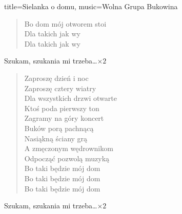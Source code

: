 \begin{song}{title={Sielanka o domu}, music={Wolna Grupa Bukowina}}
\begin{multicols}{2}
\begin{verse}
        Bo dom mój otworem stoi \\
        Dla takich jak wy \\
        Dla takich jak wy
    \end{verse}
    \begin{chorus}
        Szukam, szukania mi trzeba\ldots $\times 2$
    \end{chorus}
    \begin{verse}
        Zaproszę dzień i noc \\
        Zaproszę cztery wiatry \\
        Dla wszystkich drzwi otwarte \\
        Ktoś poda pierwszy ton \\
        Zagramy na góry koncert \\
        Buków porą pachnącą \\
        Nasiąkną ściany grą \\
        A zmęczonym wędrownikom \\
        Odpocząć pozwolą muzyką \\
        Bo taki będzie mój dom \\
        Bo taki będzie mój dom \\
        Bo taki będzie mój dom
    \end{verse}
    \begin{chorus}
        Szukam, szukania mi trzeba\ldots $\times 2$
    \end{chorus}
    \end{multicols}
\end{song}

